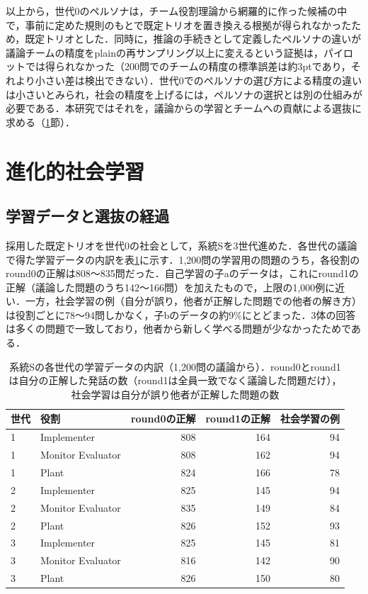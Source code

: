 以上から，世代0のペルソナは，チーム役割理論から網羅的に作った候補の中で，事前に定めた規則のもとで既定トリオを置き換える根拠が得られなかったため，既定トリオとした．同時に，推論の手続きとして定義したペルソナの違いが議論チームの精度をplainの再サンプリング以上に変えるという証拠は，パイロットでは得られなかった（200問でのチームの精度の標準誤差は約3ptであり，それより小さい差は検出できない）．世代0でのペルソナの選び方による精度の違いは小さいとみられ，社会の精度を上げるには，ペルソナの選択とは別の仕組みが必要である．本研究ではそれを，議論からの学習とチームへの貢献による選抜に求める（\ref{sec:5.3}節）．

\section{進化的社会学習}
\label{sec:5.3}

\subsection{学習データと選抜の経過}
\label{sec:5.3.1}

採用した既定トリオを世代0の社会として，系統Sを3世代進めた．各世代の議論で得た学習データの内訳を表\ref{tab:5.6}に示す．1,200問の学習用の問題のうち，各役割のround0の正解は808〜835問だった．自己学習の子aのデータは，これにround1の正解（議論した問題のうち142〜166問）を加えたもので，上限の1,000例に近い．一方，社会学習の例（自分が誤り，他者が正解した問題での他者の解き方）は役割ごとに78〜94問しかなく，子bのデータの約9\%にとどまった．3体の回答は多くの問題で一致しており，他者から新しく学べる問題が少なかったためである．

\begin{table}[htbp]
\caption{系統Sの各世代の学習データの内訳（1,200問の議論から）．round0とround1は自分の正解した発話の数（round1は全員一致でなく議論した問題だけ），社会学習は自分が誤り他者が正解した問題の数}
\label{tab:5.6}
\centering
\small
\begin{tabular}{|l|l|r|r|r|}
\hline
世代 & 役割 & round0の正解 & round1の正解 & 社会学習の例 \\
\hline
1 & Implementer & 808 & 164 & 94 \\
1 & Monitor Evaluator & 808 & 162 & 94 \\
1 & Plant & 824 & 166 & 78 \\
\hline
2 & Implementer & 825 & 145 & 94 \\
2 & Monitor Evaluator & 835 & 149 & 84 \\
2 & Plant & 826 & 152 & 93 \\
\hline
3 & Implementer & 825 & 145 & 81 \\
3 & Monitor Evaluator & 816 & 142 & 90 \\
3 & Plant & 826 & 150 & 80 \\
\hline
\end{tabular}
\end{table}

